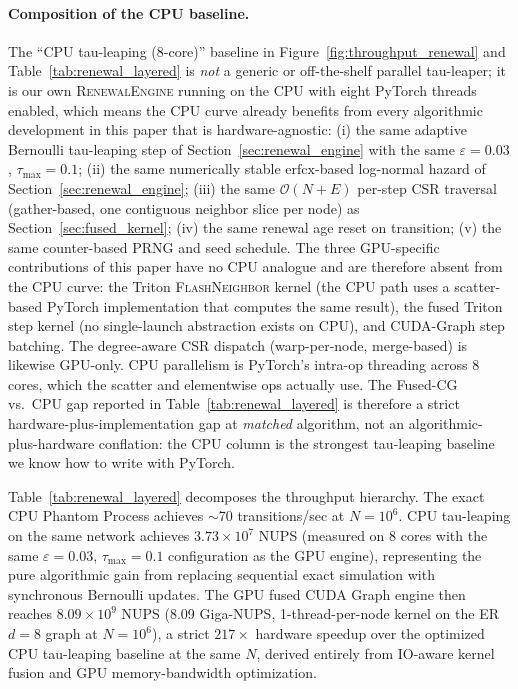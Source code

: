 \documentclass[a4paper,fleqn]{cas-sc}
\theoremstyle{definition}
\theoremstyle{remark}
\newcommand{\bigO}{\mathcal{O}}
\begin{document}
\paragraph{Composition of the CPU baseline.}
The ``CPU tau-leaping (8-core)'' baseline in Figure~\ref{fig:throughput_renewal} and Table~\ref{tab:renewal_layered} is \emph{not} a generic or off-the-shelf parallel tau-leaper; it is our own \textsc{RenewalEngine} running on the CPU with eight PyTorch threads enabled, which means the CPU curve already benefits from every algorithmic development in this paper that is hardware-agnostic:
(i) the same adaptive Bernoulli tau-leaping step of Section~\ref{sec:renewal_engine} with the same $\varepsilon = 0.03$, $\tau_{\max} = 0.1$;
(ii) the same numerically stable $\mathrm{erfcx}$-based log-normal hazard of Section~\ref{sec:renewal_engine};
(iii) the same $\bigO(N+E)$ per-step CSR traversal (gather-based, one contiguous neighbor slice per node) as Section~\ref{sec:fused_kernel};
(iv) the same renewal age reset on transition;
(v) the same counter-based PRNG and seed schedule.
The three GPU-specific contributions of this paper have no CPU analogue and are therefore absent from the CPU curve: the Triton \textsc{FlashNeighbor} kernel (the CPU path uses a scatter-based PyTorch implementation that computes the same result), the fused Triton step kernel (no single-launch abstraction exists on CPU), and CUDA-Graph step batching. The degree-aware CSR dispatch (warp-per-node, merge-based) is likewise GPU-only. CPU parallelism is PyTorch's intra-op threading across 8 cores, which the scatter and elementwise ops actually use. The Fused-CG vs.\ CPU gap reported in Table~\ref{tab:renewal_layered} is therefore a strict hardware-plus-implementation gap at \emph{matched} algorithm, not an algorithmic-plus-hardware conflation: the CPU column is the strongest tau-leaping baseline we know how to write with PyTorch.

Table~\ref{tab:renewal_layered} decomposes the throughput hierarchy. The exact CPU Phantom Process achieves $\sim$70 transitions/sec at $N = 10^6$. CPU tau-leaping on the same network achieves $3.73 \times 10^7$ NUPS (measured on 8 cores with the same $\varepsilon = 0.03$, $\tau_{\max}=0.1$ configuration as the GPU engine), representing the pure algorithmic gain from replacing sequential exact simulation with synchronous Bernoulli updates. The GPU fused CUDA Graph engine then reaches $8.09 \times 10^9$ NUPS (8.09 Giga-NUPS, 1-thread-per-node kernel on the ER $d{=}8$ graph at $N = 10^6$), a strict $217\times$ hardware speedup over the optimized CPU tau-leaping baseline at the same $N$, derived entirely from IO-aware kernel fusion and GPU memory-bandwidth optimization.
\end{document}
